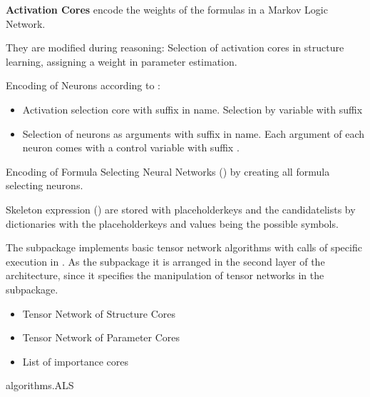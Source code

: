 \textbf{Activation Cores} encode the weights of the formulas in a Markov Logic Network.

They are modified during reasoning: Selection of activation cores in structure learning, assigning a weight in parameter estimation.




Encoding of Neurons according to :
\begin{itemize}
	\item Activation selection core with suffix  in name.
		 Selection by variable with suffix 
	\item Selection of neurons as arguments with suffix  in name.
		Each argument of each neuron comes with a control variable with suffix .
\end{itemize}

Encoding of Formula Selecting Neural Networks () by creating all formula selecting neurons.

Skeleton expression () are stored with placeholderkeys and the candidatelists by dictionaries with the placeholderkeys and values being the possible symbols.




The \spalgorithms subpackage implements basic tensor network algorithms with calls of specific execution in \spengine.
As the \spencoding subpackage it is arranged in the second layer of the \tnreason architecture, since it specifies the manipulation of tensor networks in the \spengine subpackage.



\begin{itemize}
	\item Tensor Network of Structure Cores
	\item Tensor Network of Parameter Cores
	\item List of importance cores
\end{itemize}

\begin{centeredcode}
	algorithms.ALS
\end{centeredcode}


